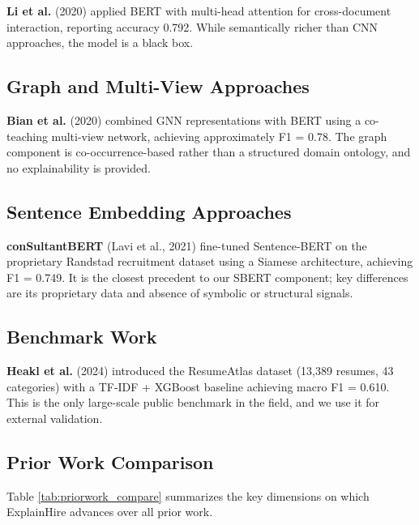 \documentclass[12pt,a4paper]{report}
\begin{document}
\textbf{Li et al.} \cite{li2020} (2020) applied BERT with multi-head attention for cross-document interaction, reporting accuracy 0.792. While semantically richer than CNN approaches, the model is a black box.

\subsection{Graph and Multi-View Approaches}

\textbf{Bian et al.} \cite{bian2020} (2020) combined GNN representations with BERT using a co-teaching multi-view network, achieving approximately F1 = 0.78. The graph component is co-occurrence-based rather than a structured domain ontology, and no explainability is provided.

\subsection{Sentence Embedding Approaches}

\textbf{conSultantBERT} \cite{lavi2021} (Lavi et al., 2021) fine-tuned Sentence-BERT on the proprietary Randstad recruitment dataset using a Siamese architecture, achieving F1 = 0.749. It is the closest precedent to our SBERT component; key differences are its proprietary data and absence of symbolic or structural signals.

\subsection{Benchmark Work}

\textbf{Heakl et al.} \cite{heakl2024} (2024) introduced the ResumeAtlas dataset (13,389 resumes, 43 categories) with a TF-IDF + XGBoost baseline achieving macro F1 = 0.610. This is the only large-scale public benchmark in the field, and we use it for external validation.

\subsection{Prior Work Comparison}

Table \ref{tab:priorwork_compare} summarizes the key dimensions on which ExplainHire advances over all prior work.
\end{document}
